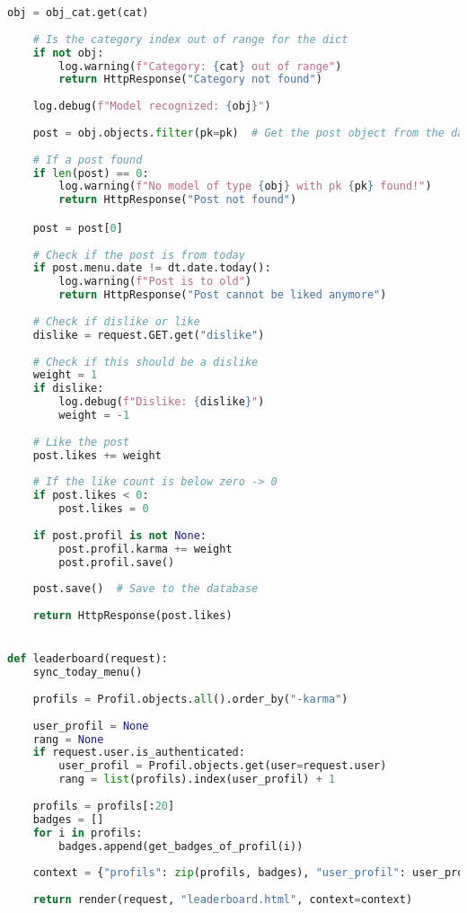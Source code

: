 \begin{lstlisting}[language=Python]
    obj = obj_cat.get(cat)
    
    # Is the category index out of range for the dict
    if not obj:
        log.warning(f"Category: {cat} out of range")
        return HttpResponse("Category not found")
    
    log.debug(f"Model recognized: {obj}")
    
    post = obj.objects.filter(pk=pk)  # Get the post object from the database
    
    # If a post found
    if len(post) == 0:
        log.warning(f"No model of type {obj} with pk {pk} found!")
        return HttpResponse("Post not found")

    post = post[0]
    
    # Check if the post is from today
    if post.menu.date != dt.date.today():
        log.warning(f"Post is to old")
        return HttpResponse("Post cannot be liked anymore")
    
    # Check if dislike or like
    dislike = request.GET.get("dislike")
    
    # Check if this should be a dislike
    weight = 1
    if dislike:
        log.debug(f"Dislike: {dislike}")
        weight = -1
    
    # Like the post
    post.likes += weight
    
    # If the like count is below zero -> 0
    if post.likes < 0:
        post.likes = 0
        
    if post.profil is not None:
        post.profil.karma += weight
        post.profil.save()
    
    post.save()  # Save to the database
    
    return HttpResponse(post.likes)


def leaderboard(request):
    sync_today_menu()
    
    profils = Profil.objects.all().order_by("-karma")
    
    user_profil = None
    rang = None
    if request.user.is_authenticated:
        user_profil = Profil.objects.get(user=request.user)
        rang = list(profils).index(user_profil) + 1
        
    profils = profils[:20]
    badges = []
    for i in profils:
        badges.append(get_badges_of_profil(i))
    
    context = {"profils": zip(profils, badges), "user_profil": user_profil, "rang": rang}
    
    return render(request, "leaderboard.html", context=context)

\end{lstlisting}